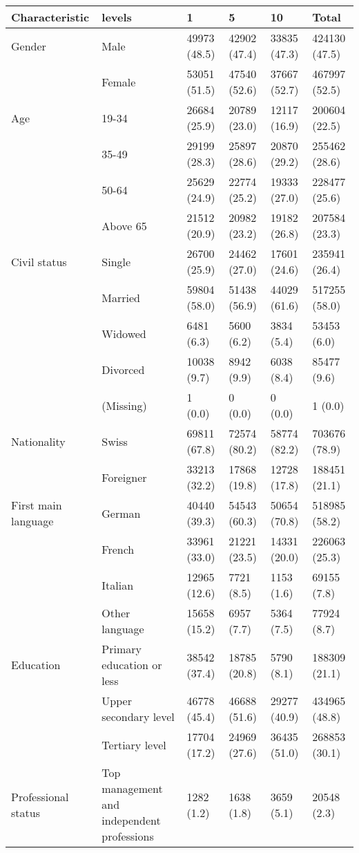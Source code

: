 
\begin{tabular}{llllll}
\toprule
Characteristic & levels & 1 & 5 & 10 & Total\\
\midrule
Gender & Male & 49973 (48.5) & 42902 (47.4) & 33835 (47.3) & 424130 (47.5)\\
 & Female & 53051 (51.5) & 47540 (52.6) & 37667 (52.7) & 467997 (52.5)\\
\addlinespace
Age & 19-34 & 26684 (25.9) & 20789 (23.0) & 12117 (16.9) & 200604 (22.5)\\
 & 35-49 & 29199 (28.3) & 25897 (28.6) & 20870 (29.2) & 255462 (28.6)\\
 & 50-64 & 25629 (24.9) & 22774 (25.2) & 19333 (27.0) & 228477 (25.6)\\
 & Above 65 & 21512 (20.9) & 20982 (23.2) & 19182 (26.8) & 207584 (23.3)\\
\addlinespace
Civil status & Single & 26700 (25.9) & 24462 (27.0) & 17601 (24.6) & 235941 (26.4)\\
 & Married & 59804 (58.0) & 51438 (56.9) & 44029 (61.6) & 517255 (58.0)\\
 & Widowed & 6481 (6.3) & 5600 (6.2) & 3834 (5.4) & 53453 (6.0)\\
 & Divorced & 10038 (9.7) & 8942 (9.9) & 6038 (8.4) & 85477 (9.6)\\
 & (Missing) & 1 (0.0) & 0 (0.0) & 0 (0.0) & 1 (0.0)\\
\addlinespace
Nationality & Swiss & 69811 (67.8) & 72574 (80.2) & 58774 (82.2) & 703676 (78.9)\\
 & Foreigner & 33213 (32.2) & 17868 (19.8) & 12728 (17.8) & 188451 (21.1)\\
\addlinespace
First main language & German & 40440 (39.3) & 54543 (60.3) & 50654 (70.8) & 518985 (58.2)\\
 & French & 33961 (33.0) & 21221 (23.5) & 14331 (20.0) & 226063 (25.3)\\
 & Italian & 12965 (12.6) & 7721 (8.5) & 1153 (1.6) & 69155 (7.8)\\
 & Other language & 15658 (15.2) & 6957 (7.7) & 5364 (7.5) & 77924 (8.7)\\
\addlinespace
Education & Primary education or less & 38542 (37.4) & 18785 (20.8) & 5790 (8.1) & 188309 (21.1)\\
 & Upper secondary level & 46778 (45.4) & 46688 (51.6) & 29277 (40.9) & 434965 (48.8)\\
 & Tertiary level & 17704 (17.2) & 24969 (27.6) & 36435 (51.0) & 268853 (30.1)\\
\addlinespace
Professional status & Top management and independent professions & 1282 (1.2) & 1638 (1.8) & 3659 (5.1) & 20548 (2.3)\\

\end{tabular}
